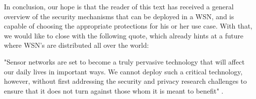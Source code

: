 \documentclass[12pt,a4paper,twoside]{report}
\begin{document}
In conclusion, our hope is that the reader of this text has received a general overview of the security mechanisms that can be deployed in a WSN, and is capable of choosing the appropriate protections for his or her use case. With that, we would like to close with the following quote, which already hints at a future where WSN's are distributed all over the world: \par
"Sensor networks are set to become a truly pervasive technology that will affect our daily lives in important ways. We cannot deploy such a critical technology, however, without first addressing the security and privacy research challenges to ensure that it does not turn against those whom it is meant to benefit" \cite{chan;perrig:2003}.\par


\iffalse
\end{document}
